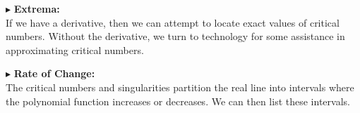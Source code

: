 \documentclass{ximera}
\begin{document}
$\blacktriangleright$ \textbf{\textcolor{red!10!blue!90!}{Extrema:}} \\
If we have a derivative, then we can attempt to locate exact values of critical numbers.  Without the derivative, we turn to technology for some assistance in approximating critical numbers.




$\blacktriangleright$ \textbf{\textcolor{red!10!blue!90!}{Rate of Change:}} \\
The critical numbers and singularities partition the real line into intervals where the polynomial function increases or decreases.  We can then list these intervals.
\end{document}
